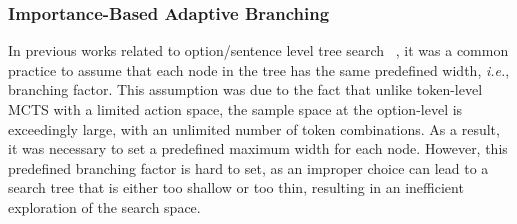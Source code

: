 

\subsubsection{Importance-Based Adaptive Branching}

In previous works related to option/sentence level tree search ~\citep{feng2023alphazero, yao2024tree}, it was a common practice to assume that each node in the tree has the same predefined width, \textit{i.e.}, branching factor. This assumption was due to the fact that unlike token-level MCTS with a limited action space, the sample space at the option-level is exceedingly large, with an unlimited number of token combinations. As a result, it was necessary to set a predefined maximum width for each node. However, this predefined branching factor is hard to set, as an improper choice can lead to a search tree that is either too shallow or too thin, resulting in an inefficient exploration of the search space.

